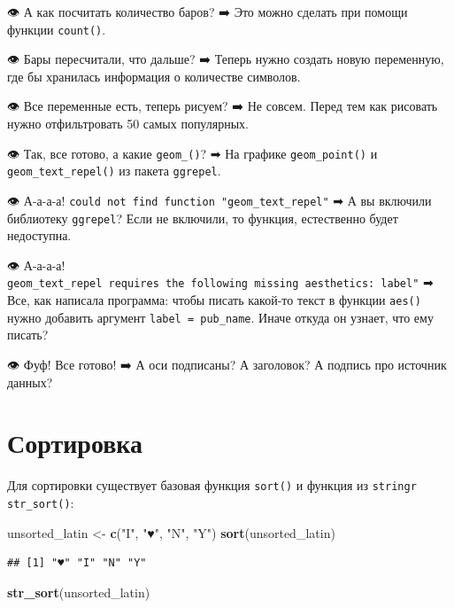 \documentclass[
]{book}
\newenvironment{Shaded}{\begin{snugshade}}{\end{snugshade}}
\newcommand{\KeywordTok}[1]{\textcolor[rgb]{0.13,0.29,0.53}{\textbf{#1}}}
\newcommand{\NormalTok}[1]{#1}
\newcommand{\StringTok}[1]{\textcolor[rgb]{0.31,0.60,0.02}{#1}}
\begin{document}
👁 А как посчитать количество баров? ➡
Это можно сделать при помощи функции \texttt{count()}.

👁 Бары пересчитали, что дальше? ➡
Теперь нужно создать новую переменную, где бы хранилась информация о количестве символов.

👁 Все переменные есть, теперь рисуем? ➡
Не совсем. Перед тем как рисовать нужно отфильтровать 50 самых популярных.

👁 Так, все готово, а какие \texttt{geom\_()}? ➡
На графике \texttt{geom\_point()} и \texttt{geom\_text\_repel()} из пакета \texttt{ggrepel}.

👁 А-а-а-а! \texttt{could\ not\ find\ function\ "geom\_text\_repel"} ➡
А вы включили библиотеку \texttt{ggrepel}? Если не включили, то функция, естественно будет недоступна.

👁 А-а-а-а! \texttt{geom\_text\_repel\ requires\ the\ following\ missing\ aesthetics:\ label"} ➡
Все, как написала программа: чтобы писать какой-то текст в функции \texttt{aes()} нужно добавить аргумент \texttt{label\ =\ pub\_name}. Иначе откуда он узнает, что ему писать?

👁 Фуф! Все готово! ➡
А оси подписаны? А заголовок? А подпись про источник данных?

\hypertarget{ux441ux43eux440ux442ux438ux440ux43eux432ux43aux430}{%
\section{Сортировка}\label{ux441ux43eux440ux442ux438ux440ux43eux432ux43aux430}}

Для сортировки существует базовая функция \texttt{sort()} и функция из \texttt{stringr} \texttt{str\_sort()}:

\begin{Shaded}
\begin{Highlighting}[]
\NormalTok{unsorted_latin <-}\StringTok{ }\KeywordTok{c}\NormalTok{(}\StringTok{"I"}\NormalTok{, }\StringTok{"♥"}\NormalTok{, }\StringTok{"N"}\NormalTok{, }\StringTok{"Y"}\NormalTok{)}
\KeywordTok{sort}\NormalTok{(unsorted_latin)}
\end{Highlighting}
\end{Shaded}

\begin{verbatim}
## [1] "♥" "I" "N" "Y"
\end{verbatim}

\begin{Shaded}
\begin{Highlighting}[]
\KeywordTok{str_sort}\NormalTok{(unsorted_latin)}
\end{Highlighting}
\end{Shaded}
\end{document}
